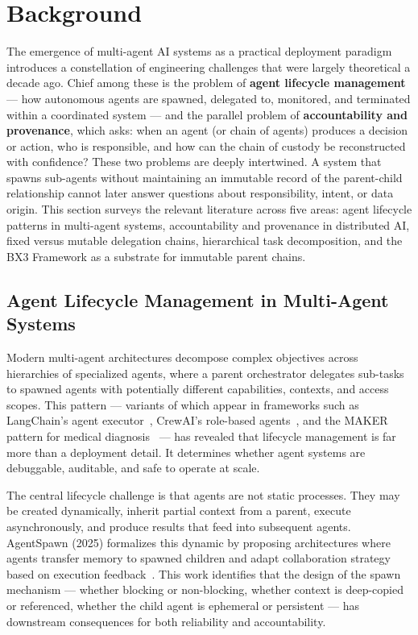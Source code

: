 \section{Background}

The emergence of multi-agent AI systems as a practical deployment paradigm introduces a constellation of engineering challenges that were largely theoretical a decade ago. Chief among these is the problem of \textbf{agent lifecycle management} — how autonomous agents are spawned, delegated to, monitored, and terminated within a coordinated system — and the parallel problem of \textbf{accountability and provenance}, which asks: when an agent (or chain of agents) produces a decision or action, who is responsible, and how can the chain of custody be reconstructed with confidence? These two problems are deeply intertwined. A system that spawns sub-agents without maintaining an immutable record of the parent-child relationship cannot later answer questions about responsibility, intent, or data origin. This section surveys the relevant literature across five areas: agent lifecycle patterns in multi-agent systems, accountability and provenance in distributed AI, fixed versus mutable delegation chains, hierarchical task decomposition, and the BX3 Framework as a substrate for immutable parent chains.

\subsection{Agent Lifecycle Management in Multi-Agent Systems}

Modern multi-agent architectures decompose complex objectives across hierarchies of specialized agents, where a parent orchestrator delegates sub-tasks to spawned agents with potentially different capabilities, contexts, and access scopes. This pattern — variants of which appear in frameworks such as LangChain's agent executor~\cite{langchain}, CrewAI's role-based agents~\cite{crewai}, and the MAKER pattern for medical diagnosis~\cite{maker-pattern} — has revealed that lifecycle management is far more than a deployment detail. It determines whether agent systems are debuggable, auditable, and safe to operate at scale.

The central lifecycle challenge is that agents are not static processes. They may be created dynamically, inherit partial context from a parent, execute asynchronously, and produce results that feed into subsequent agents. AgentSpawn (2025) formalizes this dynamic by proposing architectures where agents transfer memory to spawned children and adapt collaboration strategy based on execution feedback~\cite{agentspawn}. This work identifies that the design of the spawn mechanism — whether blocking or non-blocking, whether context is deep-copied or referenced, whether the child agent is ephemeral or persistent — has downstream consequences for both reliability and accountability.

